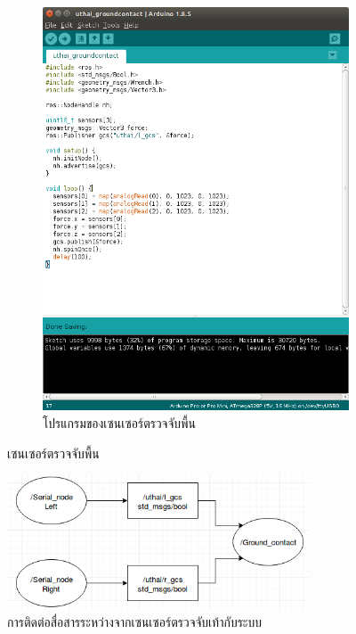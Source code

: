 \begin{figure}[!ht]
\begin{subfigure}[b]{0.50\textwidth}
        \centering
        \includegraphics[width=\textwidth]{chapter3/images/code_arduino_uthai.png}
        \caption{โปรแกรมของเซนเซอร์ตรวจจับพื้น}
    \end{subfigure}
    \caption{เซนเซอร์ตรวจจับพื้น}
\end{figure}

\begin{figure}[!ht]
	\centering
	\includegraphics[width=0.8\textwidth]{chapter3/images/node_gcs.png}
	\caption{การติดต่อสื่อสารระหว่างจากเซนเซอร์ตรวจจับเท้ากับระบบ}
\end{figure}
\clearpage
